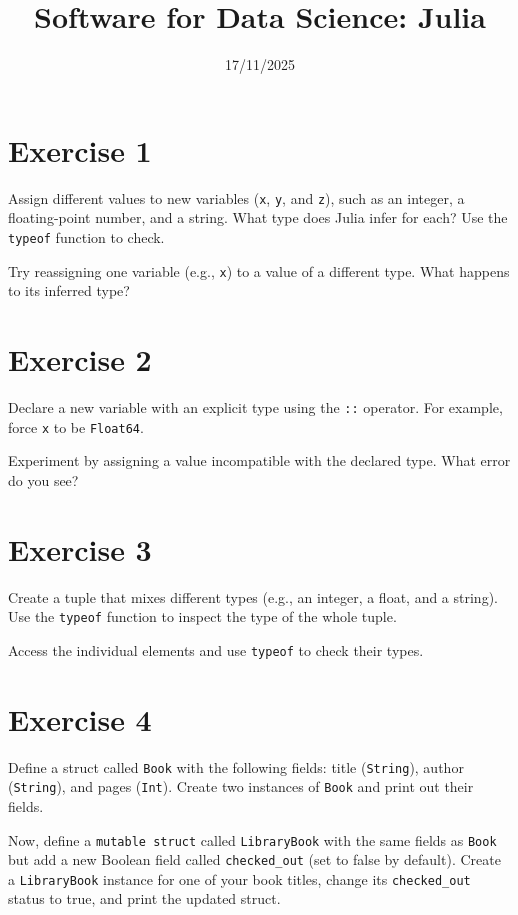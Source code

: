 \documentclass{article}
\title{Software for Data Science: Julia}
\date{17/11/2025}
\begin{document}
\maketitle
\section*{Exercise 1}

Assign different values to new variables (\texttt{x}, \texttt{y}, and \texttt{z}), such as an integer, a floating-point number, and a string. What type does Julia infer for each? Use the \texttt{typeof} function to check.

\noindent
Try reassigning one variable (e.g., \texttt{x}) to a value of a different type. What happens to its inferred type?

\section*{Exercise 2}

Declare a new variable with an explicit type using the \texttt{::} operator. For example, force \texttt{x} to be \texttt{Float64}. 

\noindent
Experiment by assigning a value incompatible with the declared type. What error do you see?

\section*{Exercise 3}

Create a tuple that mixes different types (e.g., an integer, a float, and a string). Use the \texttt{typeof} function to inspect the type of the whole tuple.

\noindent
Access the individual elements and use \texttt{typeof} to check their types.

\section*{Exercise 4}

Define a struct called \texttt{Book} with the following fields: title (\texttt{String}), author (\texttt{String}), and pages (\texttt{Int}). Create two instances of \texttt{Book} and print out their fields.

\noindent
Now, define a \texttt{mutable struct} called \texttt{LibraryBook} with the same fields as \texttt{Book} but add a new Boolean field called \texttt{checked\_out} (set to false by default). Create a \texttt{LibraryBook} instance for one of your book titles, change its \texttt{checked\_out} status to true, and print the updated struct.
\end{document}
